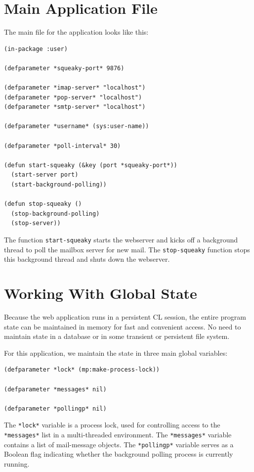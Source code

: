 \section{Main Application File}

The main file for the application looks like this:

\begin{verbatim}
(in-package :user)

(defparameter *squeaky-port* 9876)

(defparameter *imap-server* "localhost")
(defparameter *pop-server* "localhost")
(defparameter *smtp-server* "localhost")

(defparameter *username* (sys:user-name))

(defparameter *poll-interval* 30)

(defun start-squeaky (&key (port *squeaky-port*))
  (start-server port)
  (start-background-polling))

(defun stop-squeaky ()
  (stop-background-polling)
  (stop-server))
\end{verbatim}

The function \texttt{start-squeaky} starts the webserver and kicks off a background thread to
poll the mailbox server for new mail. The \texttt{stop-squeaky} function stops this background
thread and shuts down the webserver.

\section{Working With Global State}

Because the web application runs in a persistent CL session, the entire program state can
be maintained in memory for fast and convenient access. No need to maintain state in a
database or in some transient or persistent file system.

For this application, we maintain the state in three main global variables:

\begin{verbatim}
(defparameter *lock* (mp:make-process-lock))

(defparameter *messages* nil)

(defparameter *pollingp* nil)
\end{verbatim}

The \texttt{*lock*} variable is a process lock, used for controlling access to the \texttt{*messages*} list
in a multi-threaded environment. The \texttt{*messages*} variable contains a list of mail-message
objects. The \texttt{*pollingp*} variable serves as a Boolean flag indicating whether the background
polling process is currently running.

